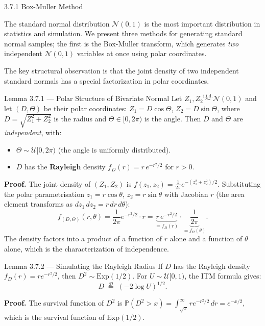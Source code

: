 \documentclass[aspectratio=169,10pt]{beamer}
\newcommand{\PP}{\mathbb{P}}
\newcommand{\UU}{\mathcal{U}}
\newcommand{\NN}{\mathcal{N}}
\begin{document}
\begin{frame}[allowframebreaks]{3.7.1 Box-Muller Method}

The standard normal distribution $\NN(0,1)$ is the most important distribution
in statistics and simulation.  We present three methods for generating standard
normal samples; the first is the Box-Muller transform, which generates \emph{two}
independent $\NN(0,1)$ variables at once using polar coordinates.

The key structural observation is that the joint density of two independent
standard normals has a special factorization in polar coordinates.

\begin{block}{Lemma 3.7.1 --- Polar Structure of Bivariate Normal}
  Let $Z_1, Z_2 \stackrel{\text{i.i.d.}}{\sim} \NN(0,1)$ and let $(D, \Theta)$
  be their polar coordinates: $Z_1 = D\cos\Theta$, $Z_2 = D\sin\Theta$,
  where $D = \sqrt{Z_1^2 + Z_2^2}$ is the radius and $\Theta \in [0, 2\pi)$
  is the angle.  Then $D$ and $\Theta$ are \emph{independent}, with:
  \begin{itemize}
    \item $\Theta \sim \UU[0, 2\pi)$ (the angle is uniformly distributed).
    \item $D$ has the \textbf{Rayleigh} density $f_D(r) = r\,e^{-r^2/2}$ for $r > 0$.
  \end{itemize}
\end{block}

\textbf{Proof.}  The joint density of $(Z_1, Z_2)$ is
$f(z_1, z_2) = \frac{1}{2\pi}e^{-(z_1^2 + z_2^2)/2}$.
Substituting the polar parametrisation $z_1 = r\cos\theta$, $z_2 = r\sin\theta$
with Jacobian $r$ (the area element transforms as $dz_1\,dz_2 = r\,dr\,d\theta$):
\[
  f_{(D,\Theta)}(r, \theta)
  = \frac{1}{2\pi} e^{-r^2/2} \cdot r
  = \underbrace{r\,e^{-r^2/2}}_{= f_D(r)} \cdot \underbrace{\frac{1}{2\pi}}_{= f_\Theta(\theta)}.
\]
The density factors into a product of a function of $r$ alone and a function of
$\theta$ alone, which is the characterization of independence.

\begin{block}{Lemma 3.7.2 --- Simulating the Rayleigh Radius}
  If $D$ has the Rayleigh density $f_D(r) = re^{-r^2/2}$, then $D^2 \sim \mathrm{Exp}(1/2)$.
  For $U \sim \UU[0,1)$, the ITM formula gives:
  \[
    D \;\overset{\mathcal{D}}{=}\; (-2\log U)^{1/2}.
  \]
\end{block}

\textbf{Proof.}  The survival function of $D^2$ is
$\PP(D^2 > x) = \int_{\sqrt{x}}^\infty r e^{-r^2/2}\,dr = e^{-x/2}$,
which is the survival function of $\mathrm{Exp}(1/2)$.


\end{frame}
\end{document}
